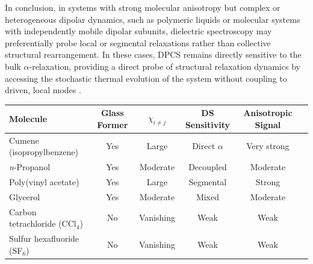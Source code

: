 In conclusion, in systems with strong molecular anisotropy but complex or heterogeneous dipolar dynamics, such as polymeric liquids or molecular systems with independently mobile dipolar subunits, dielectric spectroscopy may preferentially probe local or segmental relaxations rather than collective structural rearrangement. In these cases, DPCS remains directly sensitive to the bulk $\alpha$-relaxation, providing a direct probe of structural relaxation dynamics by accessing the stochastic thermal evolution of the system without coupling to driven, local modes \cite{Roland,Patterson}.

\begin{table}[!htbp]
	\centering
	
	\vspace{0.5em}
	
	\begin{tabular}{lccccc}
		\hline
		Molecule & Glass Former & $\chi_{i\neq j}$ & DS Sensitivity & Anisotropic Signal \\
		\hline
		Cumene (isopropylbenzene) & Yes & Large & Direct $\alpha$ & Very strong \\
		\textit{n}-Propanol & Yes & Moderate & Decoupled & Moderate \\
		Poly(vinyl acetate) & Yes & Large & Segmental & Strong \\
		Glycerol & Yes & Moderate & Mixed & Moderate \\
		\hline
		Carbon tetrachloride (CCl$_4$) & No & Vanishing & Weak & Weak \\
		Sulfur hexafluoride (SF$_6$) & No & Vanishing & Weak & Weak \\
		\hline
	\end{tabular}
	
	\label{tab:DSvsDPCS}
	
\end{table}


